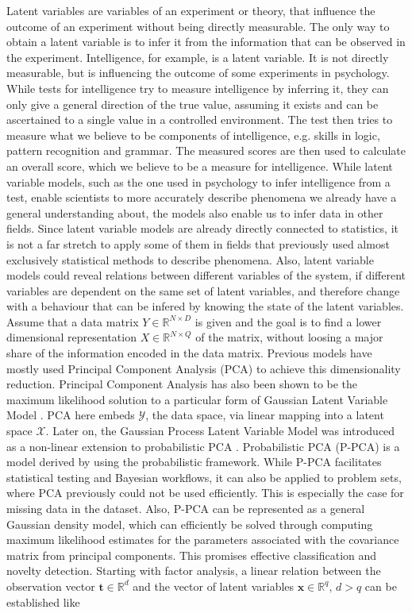 Latent variables are variables of an experiment or theory, that influence the outcome of an experiment without being directly measurable. The only way to obtain a latent variable is to infer it from the information that can be observed in the experiment. Intelligence, for example, is a latent variable. It is not directly measurable, but is influencing the outcome of some experiments in psychology. While tests for intelligence try to measure intelligence by inferring it, they can only give a general direction of the true value, assuming it exists and can be ascertained to a single value in a controlled environment. The test then tries to measure what we believe to be components of intelligence, e.g. skills in logic, pattern recognition and grammar. The measured scores are then used to calculate an overall score, which we believe to be a measure for intelligence. While latent variable models, such as the one used in psychology to infer intelligence from a test, enable scientists to more accurately describe phenomena we already have a general understanding about, the models also enable us to infer data in other fields. Since latent variable models are already directly connected to statistics, it is not a far stretch to apply some of them in fields that previously used almost exclusively statistical methods to describe phenomena. Also, latent variable models could reveal relations between different variables of the system, if different variables are dependent on the same set of latent variables, and therefore change with a behaviour that can be infered by knowing the state of the latent variables. \newline
Assume that a data matrix $Y \in \mathbb{R}^{N\times D}$ is given and the goal is to find a lower dimensional representation $X \in \mathbb{R}^{N\times Q}$ of the matrix, without loosing a major share of the information encoded in the data matrix. Previous models have mostly used Principal Component Analysis (PCA) to achieve this dimensionality reduction. Principal Component Analysis has also been shown to be the maximum likelihood solution to a particular form of Gaussian Latent Variable Model \cite{Tipping_Bishop_1999_1}\cite{Tipping_Bishop_1999_2}. PCA here embeds $\mathcal{Y}$, the data space, via linear mapping into a latent space $\mathcal{X}$. Later on, the Gaussian Process Latent Variable Model was introduced as a non-linear extension to probabilistic PCA \cite{Lawrence_2005}. \newline \newline
Probabilistic PCA (P-PCA) is a model derived by using the probabilistic framework. While P-PCA facilitates statistical testing and Bayesian workflows, it can also be applied to problem sets, where PCA previously could not be used efficiently. This is especially the case for missing data in the dataset. Also, P-PCA can be represented as a general Gaussian density model, which can efficiently be solved through computing maximum likelihood estimates for the parameters associated with the covariance matrix from principal components. This promises effective classification and novelty detection. Starting with factor analysis, a linear relation between the observation vector $\bm{t} \in \mathbb{R}^d$ and the vector of latent variables $\bm{x} \in \mathbb{R}^q \text{, } d>q$ can be established like 
